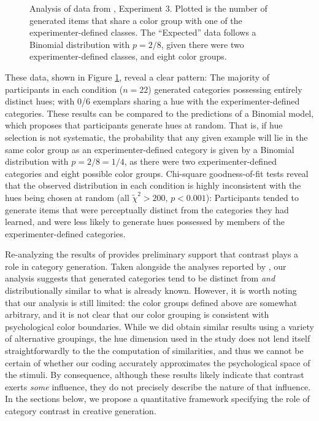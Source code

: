 \documentclass[12pt]{article}
\newcommand\inputpgf[2]{{
\let\pgfimageWithoutPath\pgfimage
\renewcommand{\pgfimage}[2][]{\pgfimageWithoutPath[##1]{#1/##2}}

}}
\begin{document}
\begin{flushleft}
\begin{figure}
    \begin{center}
        \inputpgf{figs/}{jk13-huecontrast.pgf}
        \caption{Analysis of data from \cite{jern2013probabilistic}, Experiment 3. Plotted is the number of generated items that share a color group with one of the experimenter-defined classes. The ``Expected'' data follows a Binomial distribution with $p=2/8$, given there were two experimenter-defined classes, and eight color groups.}
        \label{fig:jk13-huecontrast}
    \end{center}
\end{figure}

These data, shown in Figure \ref{fig:jk13-huecontrast}, reveal a clear pattern: The majority of participants in each condition ($n = 22$) generated categories possessing entirely distinct hues; with 0/6 exemplars sharing a hue with the experimenter-defined categories. These results can be compared to the predictions of a Binomial model, which proposes that participants generate hues at random. That is, if hue selection is not systematic, the probability that any given example will lie in the same color group as an experimenter-defined category is given by a Binomial distribution with $p = 2/8=1/4$, as there were two experimenter-defined categories and eight possible color groups. Chi-square goodness-of-fit tests reveal that the observed distribution in each condition is highly inconsistent with the hues being chosen at random (all $\tilde{\chi}^2>200$, $p<0.001$): Participants tended to generate items that were perceptually distinct from the categories they had learned, and were less likely to generate hues possessed by members of the experimenter-defined categories.

Re-analyzing the results of \cite{jern2013probabilistic} provides preliminary support that contrast plays a role in category generation. Taken alongside the analyses reported by \cite{jern2013probabilistic}, our analysis suggests that generated categories tend to be distinct from {\em and} distributionally similar to what is already known. However, it is worth noting that our analysis is still limited: the color groups defined above are somewhat arbitrary, and it is not clear that our color grouping is consistent with psychological color boundaries. While we did obtain similar results using a variety of alternative groupings, the hue dimension used in the \cite{jern2013probabilistic} study does not lend itself straightforwardly to the the computation of similarities, and thus we cannot be certain of whether our coding accurately approximates the psychological space of the stimuli. By consequence, although these results likely indicate that contrast exerts {\em some} influence, they do not precisely describe the nature of that influence. In the sections below, we propose a quantitative framework specifying the role of category contrast in creative generation.



\end{flushleft}
\end{document}
